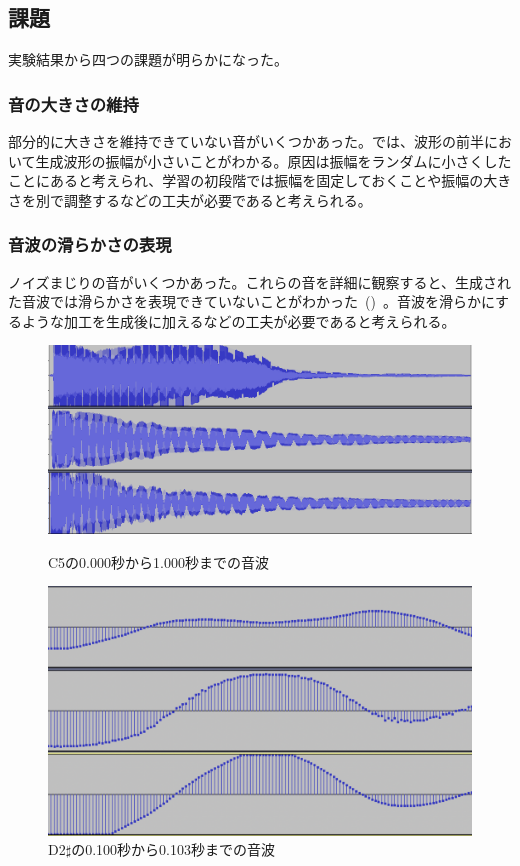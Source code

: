 \subsection{課題}

実験結果から四つの課題が明らかになった。

\subsubsection{音の大きさの維持}

部分的に大きさを維持できていない音がいくつかあった。では、波形の前半において生成波形の振幅が小さいことがわかる。原因は振幅をランダムに小さくしたことにあると考えられ、学習の初段階では振幅を固定しておくことや振幅の大きさを別で調整するなどの工夫が必要であると考えられる。
    
\subsubsection{音波の滑らかさの表現}

ノイズまじりの音がいくつかあった。これらの音を詳細に観察すると、生成された音波では滑らかさを表現できていないことがわかった~()~。音波を滑らかにするような加工を生成後に加えるなどの工夫が必要であると考えられる。

\begin{figure}[b]
\centering
\begin{minipage}{0.48\columnwidth}
\centering
\includegraphics[width=0.85\columnwidth]{figure/88_88/c5.png}
\caption[C5の音波]{C5の0.000秒から1.000秒までの音波}
\label{fig:88_88_amp}
\end{minipage}
\begin{minipage}{0.48\columnwidth}
\centering
\includegraphics[width=0.75\columnwidth]{figure/88_88_det/d2s_0100_0103.png}
\caption[D2$\sharp$の音波]{D2$\sharp$の0.100秒から0.103秒までの音波}
\label{fig:88_88_smooth}
\end{minipage}
\end{figure}

